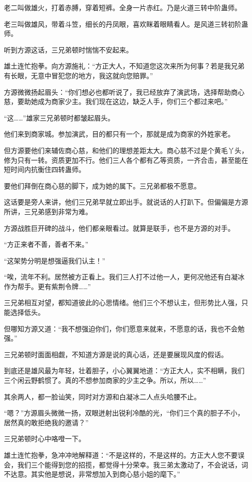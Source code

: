 \begin{this_body}
老二叫做雄火，打着赤膊，穿着短裤。全身一片赤红。乃是火道三转中阶蛊师。

老三叫做雄风，带着斗笠，细长的丹凤眼，喜欢眯着眼睛看人。是风道三转初阶蛊师。

听到方源这话，三兄弟顿时惴惴不安起来。

雄土连忙抱拳。向方源施礼：“方正大人，不知道您这次来所为何事？若是我兄弟有长眼，无意中冒犯您的地方，我这就向您赔罪。”

方源微微扬起眉头：“你们想必也都听说了，我已经放弃了演武场，选择帮助商心慈，要助她成为商家少主。我们现在这边，缺乏人手，你们三个都过来吧。”

“这……”雄家三兄弟顿时都皱起眉头。

他们来到商家城。参加演武，目的都只有一个，那就是成为商家的外姓家老。

但方源要他们来辅佐商心慈，和他们的理想差距太大。商心慈不过是个黄毛丫头，修为只有一转。资质更加不行。他们三人各个都有乙等资质，一齐合击，甚至能在短时间内抗衡住四转蛊师。

要他们拜倒在商心慈的脚下，成为她的属下。三兄弟都极不愿意。

这话要是旁人来讲，他们三兄弟早就立即出手。就说话的人打趴下。但偏偏是方源所讲，三兄弟感到非常为难。

方源战胜巨开碑的战斗，他们都亲眼看过。就算是联手，也不是方源的对手。

“方正来者不善，善者不来。”

“这架势分明是想强逼我们认主！”

“唉，流年不利。居然被方正看上。我们三人打不过他一人，更何况他还有白凝冰作为帮手。更有紫荆令牌……”

三兄弟相互对望，都知道彼此的心思情绪。他们三个不想认主，但形势比人强，只能选择低头。

但哪知方源又道：“我不想强迫你们，你们愿意来就来，不愿意的话，我也不会勉强。”

三兄弟顿时面面相觑，不知道方源是说的真心话，还是要展现风度的假话。

到底还是雄风最为年轻，壮着胆子，小心翼翼地道：“方正大人，实不相瞒，我们三个闲云野鹤惯了。真的不想参加商家的少主之争。所以，所以……”

其余两人，都一脸讪笑，同时对方源和白凝冰二人点头哈腰不止。

“嗯？”方源眉头微微一扬，双眼迸射出锐利冷酷的光，“你们三个真的胆子不小，居然真的敢拒绝我的邀请？”

三兄弟顿时心中咯噔一下。

雄土连忙抱拳，急冲冲地解释道：“不是这样的，不是这样的。方正大人您不要误会，我们三个能得到您的招揽，都觉得十分荣幸。我三弟太激动了，不会说话，词不达意。其实他是想说，非常想加入到商心慈小姐的麾下。”


\end{this_body}
